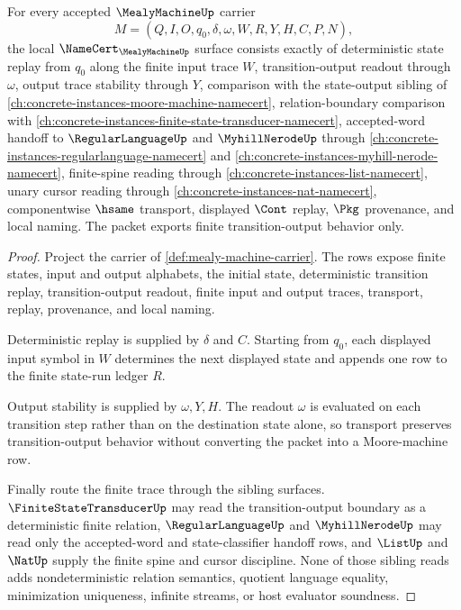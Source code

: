 \begin{theorem}
\label{thm:mealy-machine-namecert-obligations}
For every accepted $\MealyMachineUp$ carrier
$$
M=(Q,I,O,q_0,\delta,\omega,W,R,Y,H,C,P,N),
$$
the local $\NameCert_{\MealyMachineUp}$ surface consists exactly of deterministic state replay from $q_0$ along the finite input trace $W$, transition-output readout through $\omega$, output trace stability through $Y$, comparison with the state-output sibling of \autoref{ch:concrete-instances-moore-machine-namecert}, relation-boundary comparison with \autoref{ch:concrete-instances-finite-state-transducer-namecert}, accepted-word handoff to $\RegularLanguageUp$ and $\MyhillNerodeUp$ through \autoref{ch:concrete-instances-regularlanguage-namecert} and \autoref{ch:concrete-instances-myhill-nerode-namecert}, finite-spine reading through \autoref{ch:concrete-instances-list-namecert}, unary cursor reading through \autoref{ch:concrete-instances-nat-namecert}, componentwise $\hsame$ transport, displayed $\Cont$ replay, $\Pkg$ provenance, and local naming. The packet exports finite transition-output behavior only.
\end{theorem}
\begin{proof}
Project the carrier of \autoref{def:mealy-machine-carrier}. The rows expose finite states, input and output alphabets, the initial state, deterministic transition replay, transition-output readout, finite input and output traces, transport, replay, provenance, and local naming.

Deterministic replay is supplied by $\delta$ and $C$. Starting from $q_0$, each displayed input symbol in $W$ determines the next displayed state and appends one row to the finite state-run ledger $R$.

Output stability is supplied by $\omega,Y,H$. The readout $\omega$ is evaluated on each transition step rather than on the destination state alone, so transport preserves transition-output behavior without converting the packet into a Moore-machine row.

Finally route the finite trace through the sibling surfaces. $\FiniteStateTransducerUp$ may read the transition-output boundary as a deterministic finite relation, $\RegularLanguageUp$ and $\MyhillNerodeUp$ may read only the accepted-word and state-classifier handoff rows, and $\ListUp$ and $\NatUp$ supply the finite spine and cursor discipline. None of those sibling reads adds nondeterministic relation semantics, quotient language equality, minimization uniqueness, infinite streams, or host evaluator soundness.
\end{proof}

